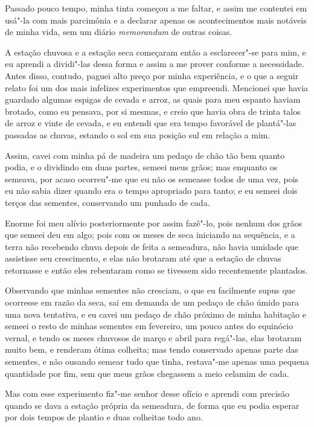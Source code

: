 Passado pouco tempo, minha tinta começou a me faltar, e assim me
contentei em usá"-la com mais parcimônia e a declarar apenas os
acontecimentos mais notáveis de minha vida, sem um diário
\emph{memorandum} de outras coisas.

A estação chuvosa e a estação seca começaram então a esclarecer"-se para
mim, e eu aprendi a dividi"-las dessa forma e assim a me prover conforme
a necessidade. Antes disso, contudo, paguei alto preço por minha
experiência, e o que a seguir relato foi um dos mais infelizes
experimentos que empreendi. Mencionei que havia guardado algumas espigas
de cevada e arroz, as quais para meu espanto haviam brotado, como eu
pensava, por si mesmas, e creio que havia obra de trinta talos de arroz
e vinte de cevada, e eu entendi que era tempo favorável de plantá"-las
passadas as chuvas, estando o sol em sua posição sul em relação a mim.

Assim, cavei com minha pá de madeira um pedaço de chão tão bem quanto
podia, e o dividindo em duas partes, semeei meus grãos; mas enquanto os
semeava, por acaso ocorreu"-me que eu não os semeasse todos de uma vez,
pois eu não sabia dizer quando era o tempo apropriado para tanto; e eu
semeei dois terços das sementes, conservando um punhado de cada.

Enorme foi meu alívio posteriormente por assim fazê"-lo, pois nenhum dos
grãos que semeei deu em algo; pois com os meses de seca iniciando na
sequência, e a terra não recebendo chuva depois de feita a semeadura,
não havia umidade que assistisse seu crescimento, e elas não brotaram
até que a estação de chuvas retornasse e então eles rebentaram como se
tivessem sido recentemente plantados.

Observando que minhas sementes não cresciam, o que eu facilmente supus
que ocorresse em razão da seca, sai em demanda de um pedaço de chão
úmido para uma nova tentativa, e eu cavei um pedaço de chão próximo de
minha habitação e semeei o resto de minhas sementes em fevereiro, um
pouco antes do equinócio vernal, e tendo os meses chuvosos de março e
abril para regá"-las, elas brotaram muito bem, e renderam ótima colheita;
mas tendo conservado apenas parte das sementes, e não ousando semear
tudo que tinha, restava"-me apenas uma pequena quantidade por fim, sem
que meus grãos chegassem a meio celamim de cada.

Mas com esse experimento fiz"-me senhor desse ofício e aprendi com
precisão quando se dava a estação própria da semeadura, de forma que eu
podia esperar por dois tempos de plantio e duas colheitas todo ano.

